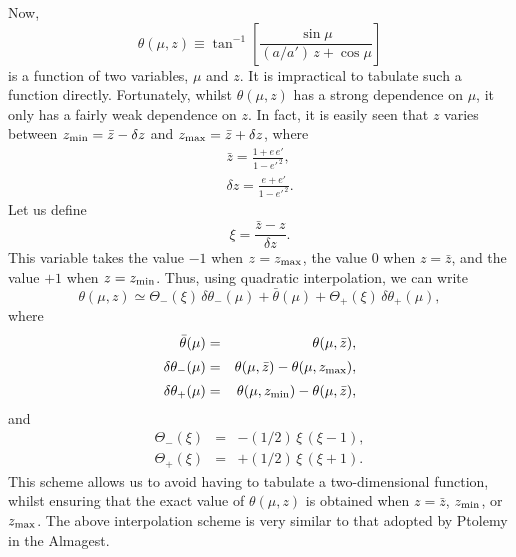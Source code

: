 Now, 
\begin{equation}
\theta(\mu,z) \equiv \tan^{-1}\left[ \frac{\sin\mu}{(a/a')\,z+ \cos\mu}\right]
\end{equation}
is a function of two variables, $\mu$ and $z$. It is impractical to tabulate
such a function directly. Fortunately, whilst $\theta(\mu,z)$
has a strong dependence on $\mu$, it only has a fairly weak dependence on $z$.
In fact, it is easily seen that $z$ varies between $z_{\rm min} = \bar{z} - \delta z$
and $z_{\rm max} = \bar{z}+\delta z$, where
\begin{eqnarray}
\bar{z} = \frac{1+e\,e'}{1-e'^{\,2}},\\[0.5ex]
\delta z = \frac{e+e'}{1-e'^{\,2}}.
\end{eqnarray}
Let us define
\begin{equation}
\xi = \frac{\bar{z}-z}{\delta z}.
\end{equation}
This variable takes the value $-1$ when $z=z_{\rm max}$, the value $0$ when
$z=\bar{z}$, and the value $+1$ when $z=z_{\rm min}$. 
Thus, using quadratic interpolation, we can write
\begin{equation}
\theta(\mu,z)\simeq \Theta_-(\xi)\,\delta\theta_-(\mu) + \bar{\theta}(\mu)
+ \Theta_+(\xi)\,\delta\theta_+(\mu),
\end{equation}
where
\begin{eqnarray}
\bar{\theta}(\mu)  &=& \theta(\mu,\bar{z}),\\[0.5ex]
\delta\theta_-(\mu) &=& \theta(\mu,\bar{z}) - \theta(\mu,z_{\rm max}),\\[0.5ex]
\delta\theta_+(\mu) &=& \theta(\mu,z_{\rm min}) - \theta(\mu,\bar{z}),
\end{eqnarray}
and
\begin{eqnarray}\label{ve52}
\Theta_-(\xi) &=& - (1/2)\,\xi\,(\xi-1),\\[0.5ex]
\Theta_+(\xi) &=&+ (1/2)\,\xi\,(\xi+1).\label{ve53}
\end{eqnarray}
This scheme allows us to avoid having to tabulate a
two-dimensional function, whilst ensuring that the exact value of $\theta(\mu,z)$ is obtained
when $z=\bar{z}$, $z_{\rm min}$, or $z_{\rm max}$. The above interpolation
scheme is very similar to that adopted by Ptolemy in the Almagest.

